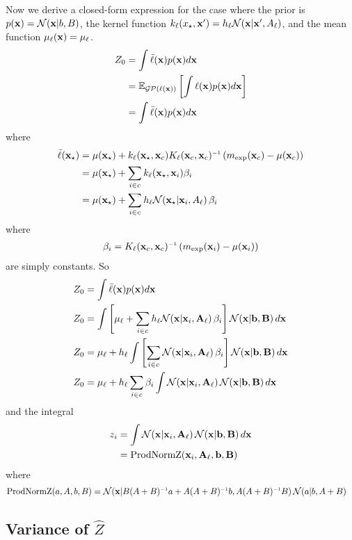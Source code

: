 Now we derive a closed-form expression for the case where the prior is $p({\bf{x}}) = \mathcal{N}\!\left({\bf{x}} \middle| b,B\right)$, the kernel function $k_\ell(x_\star, {\bf{x}}') = h_\ell\mathcal{N}\!\left({\bf{x}} \middle| {\bf{x}}',A_\ell\right)$, and the mean function $\mu_\ell({\bf{x}}) = \mu_\ell$.
%
\begin{align}
Z_0 & = \int {\bar \ell}({\bf{x}}) p({\bf{x}}) d{\bf{x}} \\
& = \mathbb{E}_{\mathcal{GP}(\ell({\bf{x}}))} \left[ \int \ell({\bf{x}}) p({\bf{x}}) d{\bf{x}} \right]\\
& = \int {\bar \ell}({\bf{x}}) p({\bf{x}}) d{\bf{x}}
\end{align}
where
\begin{align}
\mftwo(\vx\st) & = \mu(\vx\st) + k_\ell(\vx\st, \vx_c) K_\ell(\vx_c, \vx_c)\inv \left( m_{\exp}(\vx_c) - \mu(\vx_c) \right) \\
& = \mu(\vx\st) + \sum_{i \in c} k_\ell(\vx\st, \vx_i) \beta_i \\
& = \mu(\vx\st) + \sum_{i \in c} h_\ell\N{\vx\st}{\vx_i}{A_\ell} \beta_i
\end{align}
where
\begin{align}
\beta_i & = K_\ell(\vx_c, \vx_c)\inv \left( m_{\exp}(\vx_i) - \mu(\vx_i) \right) \\
\end{align}
are simply constants.  So
\begin{align}
Z_0 & = \int {\bar \ell}({\bf{x}}) p({\bf{x}}) d{\bf{x}}\\
Z_0 & = \int \left[ \mu_\ell + \sum_{i \in c} h_\ell\mathcal{N}\!\left({\bf{x}} \middle| {\bf{x}}_i,{\bf{A}}_\ell\right) \beta_i \right] \mathcal{N}\!\left({\bf{x}} \middle| {\bf{b}},\mathbf{B}\right) d{\bf{x}}\\
Z_0 & = \mu_\ell + h_\ell \int \left[ \sum_{i \in c} \mathcal{N}\!\left({\bf{x}} \middle| {\bf{x}}_i,{\bf{A}}_\ell\right) \beta_i \right] \mathcal{N}\!\left({\bf{x}} \middle| {\bf{b}},\mathbf{B}\right) d{\bf{x}}\\
Z_0 & = \mu_\ell + h_\ell \sum_{i \in c} \beta_i \int \mathcal{N}\!\left({\bf{x}} \middle| {\bf{x}}_i,{\bf{A}}_\ell\right) \mathcal{N}\!\left({\bf{x}} \middle| {\bf{b}},\mathbf{B}\right) d{\bf{x}}
\end{align}
and the integral
\begin{align}
z_i & = \int \mathcal{N}\!\left({\bf{x}} \middle| {\bf{x}}_i,{\bf{A}}_\ell\right) \mathcal{N}\!\left({\bf{x}} \middle| {\bf{b}},\mathbf{B}\right) d{\bf{x}} \\
& = \textrm{ProdNormZ}({\bf{x}}_i, {\bf{A}}_\ell, {\bf{b}}, \mathbf{B}) \\
\end{align}
where
\begin{align}
\textrm{ProdNormZ}(a, A, b, B) & = \N{\vx}{B( A + B)\inv a + A(A + B)\inv b}{A(A + B)\inv B} \N{a}{b}{A+B}
\end{align}


\subsection{Variance of $\hat Z$}

